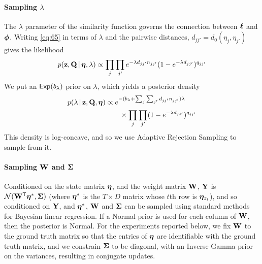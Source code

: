 \paragraph{Sampling \texorpdfstring{$\lambda$}{kernel decay rate}}
\label{sec:sampling-lambda}
The $\lambda$ parameter of the similarity function governs the
connection between $\boldsymbol{\ell}$ and $\boldsymbol{\phi}$.  Writing \eqref{eq:65} in
terms of $\lambda$ and the pairwise distances, $d_{jj'} =
d_0(\eta_j, \eta_{j'})$ gives the likelihood
\begin{equation}
  \label{eq:88}
  p(\mathbf{z}, \mathbf{Q} \, \vert \, \boldsymbol{\eta}, \lambda) \propto \prod_{j}\prod_{j'}
  e^{-\lambda d_{jj'} n_{jj'}}(1-e^{-\lambda d_{jj'}})^{q_{jj'}} 
\end{equation}
We put an $\mathsf{Exp}(b_{\lambda})$ prior on $\lambda$, which yields a
posterior density
\begin{align}
  \label{eq:88}
  p(\lambda \, \vert \, \mathbf{z}, \mathbf{Q}, \boldsymbol{\eta}) &\propto
  e^{-(b_{\lambda} + \sum_{j}\sum_{j'} d_{jj'} n_{jj'})\lambda}
  \\ & \qquad \times \prod_{j}\prod_{j'}
  (1-e^{-\lambda d_{jj'}})^{q_{jj'}} \notag
\end{align}
This density is log-concave, and so we use Adaptive Rejection Sampling \cite{gilks1992adaptive}
to sample from it.

\paragraph{Sampling \texorpdfstring{$\mathbf{W}$}{weights} and
  \texorpdfstring{$\boldsymbol{\Sigma}$}{emission covariance}}
Conditioned on the state matrix $\boldsymbol{\eta}$, and the weight matrix
$\mathbf{W}$, $\mathbf{Y}$ is $\mathcal{N}(\mathbf{W}^{\sf T} \boldsymbol{\eta}^*,\boldsymbol{\Sigma})$ (where
$\boldsymbol{\eta}^*$ is the $T \times D$ matrix whose $t$th row is
$\boldsymbol{\eta}_{z_t}$), and so conditioned on $\mathbf{Y}$, and $\boldsymbol{\eta}^*$, 
$\mathbf{W}$ and $\boldsymbol{\Sigma}$ can be sampled using standard methods
for Bayesian linear regression.  If a Normal prior is used for each
column of $\mathbf{W}$, then the posterior is Normal.  For the experiments
reported below, we fix $\mathbf{W}$ to the ground truth matrix so that the entries of
$\boldsymbol{\eta}$ are identifiable with the ground truth matrix, and we 
constrain $\boldsymbol{\Sigma}$ to be diagonal, with
an Inverse Gamma prior on the variances, resulting in conjugate updates.


